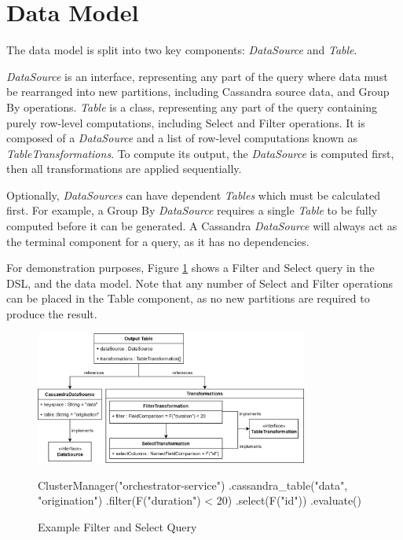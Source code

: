 \section{Data Model}\label{subsec:data-model}
The data model is split into two key components: \textit{DataSource} and \textit{Table}. 

\textit{DataSource} is an interface, representing any part of the query where data must be rearranged into new partitions, including Cassandra source data, and Group By operations. \textit{Table} is a class, representing any part of the query containing purely row-level computations, including Select and Filter operations. It is composed of a \textit{DataSource} and a list of row-level computations known as \textit{TableTransformations}. To compute its output, the \textit{DataSource} is computed first, then all transformations are applied sequentially.

Optionally, \textit{DataSources} can have dependent \textit{Tables} which must be calculated first. For example, a Group By \textit{DataSource} requires a single \textit{Table} to be fully computed before it can be generated. A Cassandra \textit{DataSource} will always act as the terminal component for a query, as it has no dependencies.

For demonstration purposes, Figure \ref{fig:filter-select-query} shows a Filter and Select query in the DSL, and the data model. Note that any number of Select and Filter operations can be placed in the Table component, as no new partitions are required to produce the result.

\begin{figure}[htp]
	\centering
	\includegraphics[width=0.8\textwidth]{chapters/diagrams/implementation/filter-select-query}
	\begin{python}
ClusterManager("orchestrator-service")
.cassandra_table("data", "origination")
.filter(F("duration") < 20)
.select(F("id"))
.evaluate()
	\end{python}
	\caption{Example Filter and Select Query}
	\label{fig:filter-select-query}
\end{figure}


